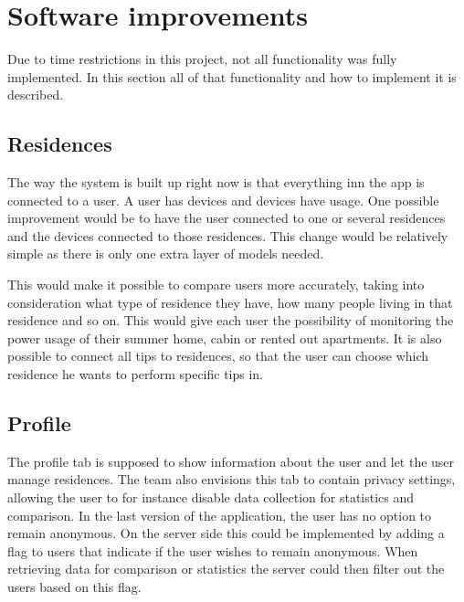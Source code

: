\section{Software improvements}
Due to time restrictions in this project, not all functionality was fully implemented. In this section all of that functionality and how to implement it is described. 

\subsection{Residences}
The way the system is built up right now is that everything inn the app is connected to a user. A user has devices and devices have usage. One possible improvement would be to have the user connected to one or several residences and the devices connected to those residences. This change would be relatively simple as there is only one extra layer of models needed.

This would make it possible to compare users more accurately, taking into consideration what type of residence they have, how many people living in that residence and so on. This would give each user the possibility of monitoring the power usage of their summer home, cabin or rented out apartments. It is also possible to connect all tips to residences, so that the user can choose which residence he wants to perform specific tips in. 

\subsection{Profile}
The profile tab is supposed to show information about the user and let the user manage residences. The team also envisions this tab to contain privacy settings, allowing the user to for instance disable data collection for statistics and comparison. In the last version of the application, the user has no option to remain anonymous. 
On the server side this could be implemented by adding a flag to users that indicate if the user wishes to remain anonymous. When retrieving data for comparison or statistics the server could then filter out the users based on this flag.